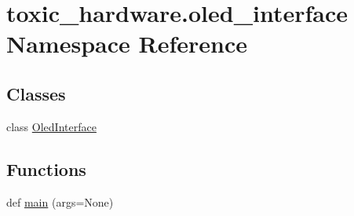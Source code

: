 \hypertarget{namespacetoxic__hardware_1_1oled__interface}{}\section{toxic\+\_\+hardware.\+oled\+\_\+interface Namespace Reference}
\label{namespacetoxic__hardware_1_1oled__interface}
\subsection*{Classes}
\begin{DoxyCompactItemize}
\item 
class \mbox{\hyperlink{classtoxic__hardware_1_1oled__interface_1_1OledInterface}{Oled\+Interface}}
\end{DoxyCompactItemize}
\subsection*{Functions}
\begin{DoxyCompactItemize}
\item 
def \mbox{\hyperlink{namespacetoxic__hardware_1_1oled__interface_accb1149d5c8c645c307fcb16452ac121}{main}} (args=None)
\end{DoxyCompactItemize}
